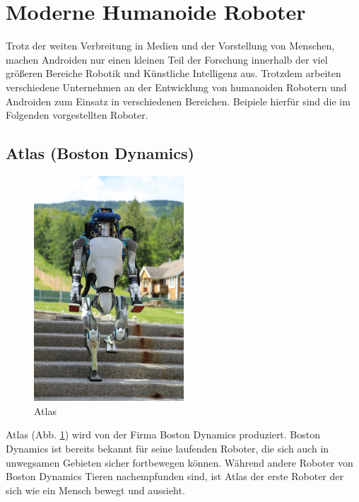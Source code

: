 \section{Moderne Humanoide Roboter}\label{sec:moderne-humanoide-roboter}
Trotz der weiten Verbreitung in Medien und der Vorstellung von
Menschen, machen Androiden nur einen kleinen Teil der Forschung innerhalb der
viel größeren Bereiche Robotik und Künstliche Intelligenz aus.
\cite{Dautenhahn2011} Trotzdem arbeiten verschiedene Unternehmen an der
Entwicklung von humanoiden Robotern und Androiden zum Einsatz in verschiedenen
Bereichen. Beipiele hierfür sind die im Folgenden vorgestellten Roboter.

\subsection{Atlas (Boston Dynamics)}
\begin{figure}
  \centering
     \includegraphics[width=0.5\textwidth]{atlas}
  \caption{Atlas \cite{AbbildungAtlas}}
  \label{fig:atlas}
\end{figure}
Atlas (Abb. \ref{fig:atlas}) wird von der Firma Boston Dynamics produziert.
Boston Dynamics ist bereits bekannt für seine laufenden Roboter, die sich auch
in unwegsamen Gebieten sicher fortbewegen können. Während andere Roboter von
Boston Dynamics Tieren nachempfunden sind, ist Atlas der erste Roboter der sich
wie ein Mensch bewegt und aussieht.

